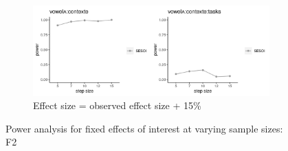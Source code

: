 \documentclass[12 pt]{article}
\begin{document}
\begin{figure}[!htb]
	
	\begin{subfigure}[t]{0.8\textwidth}
		\centering
		\includegraphics[width=\textwidth]{powerplot_f2_plus15} 
		\caption{Effect size = observed effect size + 15\%} \label{f2_plus15}
	\end{subfigure}
	
	\caption{Power analysis for fixed effects of interest at varying sample sizes: F2}
	
\end{figure}

\newpage



\clearpage

\end{document}
